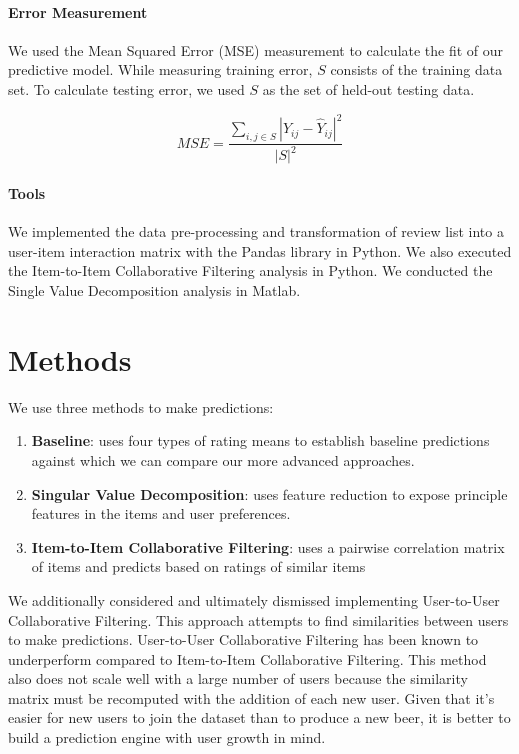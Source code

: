 \documentclass[12pt]{article}
\begin{document}
\paragraph{Error Measurement}
We used the Mean Squared Error (MSE) measurement to calculate the fit of our predictive model. While measuring training error, $S$ consists of the training data set. To calculate testing error, we used $S$ as the set of held-out testing data.

$$ {MSE} = \frac{\sum\limits_{i,j \in S} {{|Y_{ij} - \hat{Y}_{ij}|}}^2}{{{|S|}}^2} $$

\paragraph{Tools}
We implemented the data pre-processing and transformation of review list into a user-item interaction matrix with the Pandas library in Python. We also executed the Item-to-Item Collaborative Filtering analysis in Python. We conducted the Single Value Decomposition analysis in Matlab.

\section{Methods}
We use three methods to make predictions:

\begin{enumerate}
  \item \textbf{Baseline}: uses four types of rating means to establish baseline predictions against which we can compare our more advanced approaches.
  \item \textbf{Singular Value Decomposition}: uses feature reduction to expose principle features in the items and user preferences.
  \item \textbf{Item-to-Item Collaborative Filtering}: uses a pairwise correlation matrix of items and predicts based on ratings of similar items
\end{enumerate}

We additionally considered and ultimately dismissed implementing User-to-User Collaborative Filtering. This approach attempts to find similarities between users to make predictions. User-to-User Collaborative Filtering has been known to underperform compared to Item-to-Item Collaborative Filtering.\textsuperscript{\cite{sarwar}} This method also does not scale well with a large number of users because the similarity matrix must be recomputed with the addition of each new user. Given that it's easier for new users to join the dataset than to produce a new beer, it is better to build a prediction engine with user growth in mind.\textsuperscript{\cite{linden}}
\end{document}
